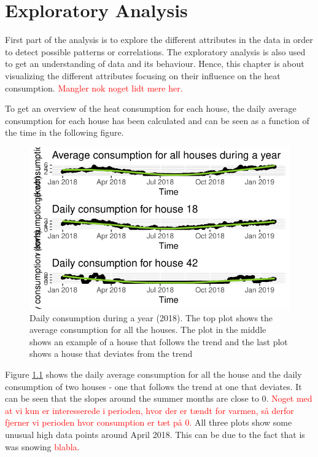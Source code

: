 \chapter{Exploratory Analysis}
First part of the analysis is to explore the different attributes in the data in order to detect possible patterns or correlations. The exploratory analysis is also used to get an understanding of data and its behaviour. Hence, this chapter is about visualizing the different attributes focusing on their influence on the heat consumption. \textcolor{red}{Mangler nok noget lidt mere her.}

To get an overview of the heat consumption for each house, the daily average consumption for each house has been calculated and can be seen as a function of the time in the following figure. 
\begin{figure}[H]
    \centering
    \includegraphics[width=.75\textwidth]{../../../figures/daily_cons.pdf}
    \caption{Daily consumption during a year (2018). The top plot shows the average consumption for all the houses. The plot in the middle shows an example of a house that follows the trend and the last plot shows a house that deviates from the trend}
    \label{fig: daily_cons}
\end{figure}
Figure \ref{fig: daily_cons} shows the daily average consumption for all the house and the daily consumption of two houses - one that follows the trend at one that deviates. It can be seen that the slopes around the summer months are close to 0. \textcolor{red}{Noget med at vi kun er interesserede i perioden, hvor der er tændt for varmen, så derfor fjerner vi perioden hvor consumption er tæt på 0.} All three plots show some unusual high data points around April 2018. This can be due to the fact that is was snowing \textcolor{red}{blabla}. \\

